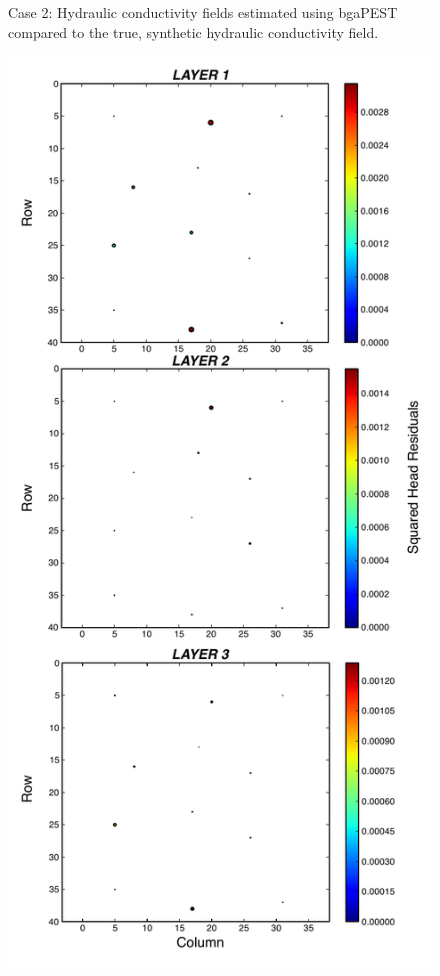 \documentclass[11pt,oneside,onecolumn]{usgsreport}
\begin{document}
\begin{appendix}
\begin{figure}[H]
\caption{\label{fig:3LK_case2}Case 2: Hydraulic conductivity fields estimated
using bgaPEST compared to the true, synthetic hydraulic conductivity
field.}
\end{figure}


\begin{figure}[H]
\begin{center}\includegraphics[scale=0.5]{figures/3L_resid_case2}\end{center}


\end{figure}
\end{appendix}
\end{document}
